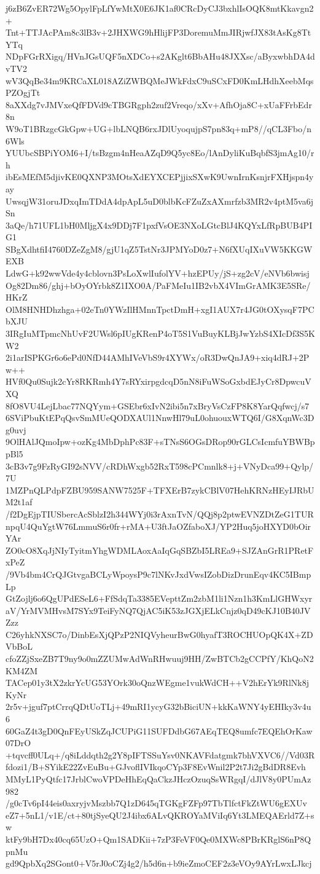 j6zB6ZvER72Wg5OpylFpLfYwMtX0E6JK1af0CRcDyCJ3bxhlIsOQK8mtKkavgn2+
Tnt+TTJAcPAm8c3lB3v+2JHXWG9hHlijFP3DoremuMmJIRjwfJX83tAsKg8TtYTq
NDpFGrRXigq/HVnJGsUQF5nXDCo+s2AKglt6BbAHu48JXXsc/aByxwbhDA4dvTV2
wV3QqBe34m9KRCaXL018AZiZWBQMeJWkFdxC9uSCxFD0KmLHdhXeebMqsPZOgjTt
8aXXdg7vJMVxeQfFDVd9cTBGRgph2zuf2Vreqo/xXv+AfhOja8C+xUaFFrbEdr8n
W9oT1BRzgcGkGpw+UG+lbLNQB6rxJDlUyoqujpS7pn83q+mP8//qCL3Fbo/n6Wls
YUUbcSBPiYOM6+I/tsBzgm4nHeaAZqD9Q5yc8Eo/lAnDyliKuBqbfS3jmAg10/rh
ibEsMEfM5djivKE0QXNP3MOtsXdEYXCEPjjixSXwK9UwnIrnKsnjrFXHjspn4yay
UwsqjW31oruJDxqImTDdA4dpApL5uD0blbKcFZuZxAXmrfzb3MR2v4ptM5va6jSn
3aQe/h71UFL1bH0MljgX4x9DDj7F1pxfVsOE3NXoLGtcBlJ4KQYxLfRpBUB4PIG1
SBgXdhtfiI4760DZeZgM8/gjU1qZ5TstNr3JPMYoD0z7+N6fXUqIXuVW5KKGWEXB
LdwG+k92wwVde4y4cblovn3PsLoXwlIufolYV+hzEPUy/jS+zg2cV/eNVb6bwisj
Og82Dm86/ghj+bOyOYrbk8Z1IXO0A/PaFMeIu1IB2vbX4VImGrAMK3E5SRe/HKrZ
OlM8HNHDhzhga+02eTn0YWzIlHMnnTpctDmH+xgI1AUX7r4JG0tOXysqF7PCbXJU
3IRgIuMTpmcNhUvF2UWsl6pIUgKRenP4oT5S1VuBuyKLBjJwYzbS4XIcDf3S5KW2
2i1arISPKGr6o6ePd0NfD44AMhIVeVbS9r4XYWx/oR3DwQnJA9+xiq4dRJ+2Pw++
HVf0Qu0Sujk2cYr8RKRmh4Y7sRYxirpgdcqD5nN8iFuWSoGxbdEJyCr8DpwcuVXQ
8fO8VU4LejLbac77NQYym+GSEbr6xIvN2ibi5n7xBryVsCzFP8K8YarQqfwcj/s7
6SViPbuKtEPqQsvSmMUeQODXAUl1NnwHl79uL0ohuouxWTQ6I/G8XqnWc3Dg0uvj
9OlHAlJQmoIpw+ozKg4MbDphPc83F+sTNsS6OGsDRop90rGLCsIcmfuYBWBppBl5
3cB3v7g9FzRyGI92sNVV/cRDhWxgb52RxT598cPCmnlk8+j+VNyDca99+Qylp/7U
1MZPnQLPdpFZBU959SANW7525F+TFXErB7zykCBlV07HehKRNzHEyIJRbUM2t1af
/f2DgEjpTIUSbercAcSblzI2h344WYj0i3rAxnTvN/QQj8p2ptwEVNZDtZeG1TUR
npqU4QuYgtW76LmmuS6r0fr+rMA+U3ftJaOZfaboXJ/YP2Huq5joHXYD0bOirYAr
ZO0cO8XqJjNIyTyitmYhgWDMLAoxAaIqGqSBZbI5LREa9+SJZAnGrR1PRetFxPeZ
/9Vb4bm4CrQJGtvgaBCLyWpoysP9c7lNKvJxdVwsIZobDizDrunEqv4KC5IBmpLp
GtZojlj6o6QgUPdESeL6+FfSdqTa3385EVepttZm2zbM1li1Nzn1h3KmLlGHWxyr
aV/YrMVMHvsM7SYx9TeiFyNQ7QjAC5iK53zJGXjELkCnjz0qD49cKJ10B40JVZzz
C26yhkNXSC7o/DinbEsXjQPzP2NIQVyheurBwG0hyafT3ROCHUOpQK4X+ZDVbBoL
cfoZZjSxeZB7T9ny9o0mZZUMwAdWnRHwuuj9HH/ZwBTCb2gCCPfY/KhQoN2KM4ZM
TACep01y3tX2zkrYcUG53YOrk30oQnzWEgme1vukWdCH++V2hErYk9RlNk8jKyNr
2r5v+jguf7ptCrrqQDtUoTLj+49mRI1ycyG32bBiciUN+kkKaWNY4yEHIky3v4u6
60GaZ4t3gD0QnFEyUSkZqJCUPiG11SUFDdbG67AEqTEQ8umfc7EQEhOrKaw07DrO
+tqvcff0ULq+/q8iLddqth2g2Y8pIFTSSuYsv0NKAVFdatgmk7bhVXVC6//Vd03R
fdozi1/B+SYikE22ZvEuBu+GJvoflIVIkqoCYp3F8EvWnil2P2t7Ji2gBdDR8Evh
MMyL1PyQtfc17JrblCwoVPDeHhEqQaCkzJHczOzuqSsWRgqI/dJlV8y0PUmAz982
/g0cTv6pI44eis0axryjvMszbb7Q1zD645qTGKgFZFp97TbTlfctFkZtWU6gEXUv
eZ7+5nL1/v1E/ct+80tjSyeQU2J4ibx6ALvQKROYaMViIq6Yt3LMEQAErld7Z+sw
ktFy9bH7Dx40cq65UzO+Qm1SADKii+7zP3FeVF0Qe0MXWc8PBrKRglS6nP8QpnMu
gd9QpbXq2SGont0+V5rJ0oCZj4g2/h5d6n+b9ieZmoCEF2z3eVOy9AYrLwxLJkcj
